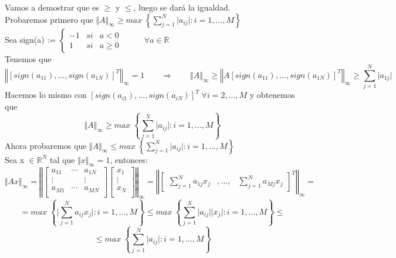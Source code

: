 \documentclass[10pt, a4paper]{article}
\makeatletter
\renewenvironment{proof}[1][\proofname] {\par\pushQED{\qed}\normalfont\topsep6\p@\@plus6\p@\relax\trivlist\item[\hskip\labelsep\itshape\sffamily#1\@addpunct{.}]\ignorespaces}{\popQED\endtrivlist\@endpefalse}
\theoremstyle{theorem-style}
\theoremstyle{definition-style}
\theoremstyle{remark-style}
\theoremstyle{example-style}
\theoremstyle{definition-style}
\theoremstyle{remark-style}
\makeatother
\begin{document}
\begin{proof} Vamos a demostrar que es $\geq$ y $\leq$, luego se dará la igualdad.\\
Probaremos primero que $ \Vert A \Vert _\infty \geq max \; \left\lbrace \sum_{j=1}^N \vert a_{ij} \vert : i = 1,...,M \right\rbrace $\\
Sea sign(a) := $\left\{ \begin{array}{lcc}
-1 & si & a < 0 \\
1 & si & a \geq 0
\end{array}
\right.$ $\qquad$ $\forall a \in \mathbb{R}$\\
Tenemos que
\[ \left\Vert \left[ sign(a_{11}),...,sign(a_{1N}) \right] ^T \right\Vert _\infty = 1 \qquad \Rightarrow \qquad \Vert A \Vert _\infty \geq \left\Vert A \left[ sign(a_{11}),...,sign(a_{1N}) \right] ^T \right\Vert _\infty \geq \sum_{j=1}^N \vert a_{1j} \vert \]
Hacemos lo mismo con $\left[ sign(a_{i1}),...,sign(a_{iN}) \right] ^T \; \forall i = 2,...,M$ y obtenemos que
\[ \Vert A \Vert _\infty \geq max \; \left\lbrace \sum_{j=1}^N \vert a_{ij} \vert : i = 1,...,M \right\rbrace \]
Ahora probaremos que $ \Vert A \Vert _\infty \leq max \; \left\lbrace \sum_{j=1}^N \vert a_{ij} \vert : i = 1,...,M \right\rbrace $\\
Sea x $\in \mathbb{R}^N$ tal que $\Vert x \Vert _\infty = 1$, entonces:
\[ \Vert Ax \Vert _\infty = \left\Vert 
\begin{bmatrix} 
a_{11} &  \cdots & a_{1N} \\
\vdots & & \vdots 
\\ a_{M1} & \cdots & a_{MN} \\ \end{bmatrix} 
\begin{bmatrix}
x_1 \\
\vdots \\
x_N \\
\end{bmatrix}
\right\Vert _\infty = \left\Vert 
\begin{bmatrix}
\sum_{j=1}^N a_{1j}x_j & ,\ldots , & \sum_{j=1}^N a_{Mj}x_j 
\end{bmatrix} ^T
\right\Vert _\infty = \] \[= max \; \left\lbrace \vert \sum_{j=1}^N a_{ij}x_j \vert : i = 1,...,M \right\rbrace \leq max \; \left\lbrace \sum_{j=1}^N \vert a_{ij} \vert \vert x_j \vert : i = 1,...,M \right\rbrace \leq \] \[ \leq max \; \left\lbrace \sum_{j=1}^N \vert a_{ij} \vert : i = 1,...,M \right\rbrace \] 
\end{proof}
\end{document}
